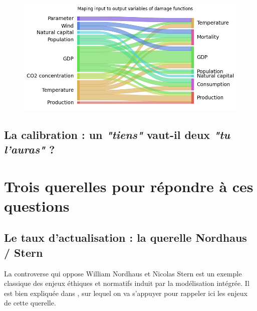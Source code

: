 \begin{figure}
    \label{fig:ACP}
\end{figure}


\begin{figure}
    \centering
    \includegraphics[width=0.9\linewidth]{figures/sankey.png}
    \label{fig:sankey}
\end{figure}

\subsection{La calibration : un \textit{"tiens"} vaut-il deux \textit{"tu l'auras"} ?}

\section{Trois querelles pour répondre à ces questions}

\subsection{Le taux d'actualisation : la querelle Nordhaus / Stern}

La controverse qui oppose William Nordhaus et Nicolas Stern est un exemple classique des enjeux éthiques et normatifs induit par la modélisation intégrée. Il est bien expliquée dans \cite{guigourez_10_2023}, sur lequel on va s'appuyer pour rappeler ici les enjeux de cette querelle. \\

